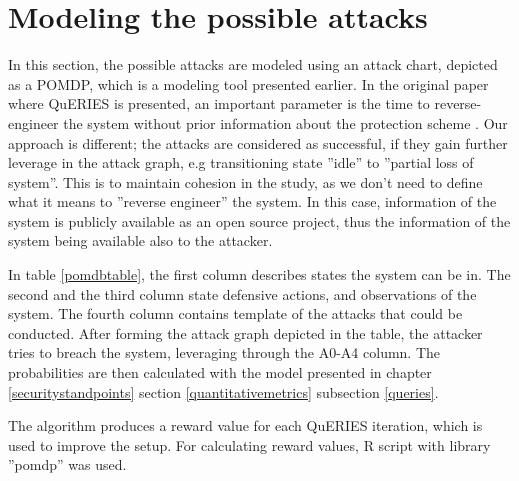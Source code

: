 \section{Modeling the possible attacks}

In this section, the possible attacks are modeled using an attack
chart, depicted as a POMDP, which is a modeling tool presented
earlier. In the original paper where QuERIES is presented, an
important parameter is the time to reverse-engineer the system without
prior information about the protection scheme
\cite{carin2008cybersecurity}. Our approach is different; the attacks
are considered as successful, if they gain further leverage in the
attack graph, e.g transitioning state ''idle'' to ''partial loss of
system''. This is to maintain cohesion in the study, as we don't need
to define what it means to ''reverse engineer'' the system. In this
case, information of the system is publicly available as an open
source project, thus the information of the system being available
also to the attacker.

In table \ref{pomdbtable}, the first column describes states the
system can be in. The second and the third column state defensive
actions, and observations of the system. The fourth column contains
template of the attacks that could be conducted. After forming the
attack graph depicted in the table, the attacker tries to breach the
system, leveraging through the A0-A4 column. The probabilities are
then calculated with the model presented in chapter
\ref{securitystandpoints} section \ref{quantitativemetrics} subsection
\ref{queries}.

The algorithm produces a reward value for each QuERIES iteration,
which is used to improve the setup. For calculating reward values, R
script with library ''pomdp'' was used.

